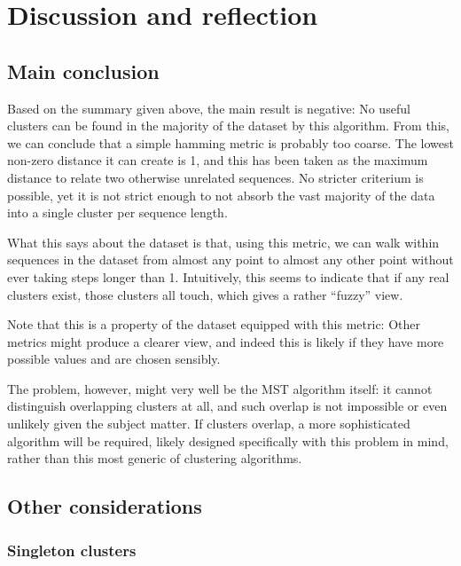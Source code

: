 \documentclass[fleqn]{book}
\begin{document}
\chapter{Discussion and reflection}\label{discussion-and-reflection}

\section{Main conclusion}\label{main-conclusion}

Based on the summary given above, the main result is negative: No useful
clusters can be found in the majority of the dataset by this algorithm.
From this, we can conclude that a simple hamming metric is probably too
coarse. The lowest non-zero distance it can create is 1, and this has
been taken as the maximum distance to relate two otherwise unrelated
sequences. No stricter criterium is possible, yet it is not strict
enough to not absorb the vast majority of the data into a single cluster
per sequence length.

What this says about the dataset is that, using this metric, we can walk
within sequences in the dataset from almost any point to almost any
other point without ever taking steps longer than 1. Intuitively, this
seems to indicate that if any real clusters exist, those clusters all
touch, which gives a rather ``fuzzy'' view.

Note that this is a property of the dataset equipped with this metric:
Other metrics might produce a clearer view, and indeed this is likely if
they have more possible values and are chosen sensibly.

The problem, however, might very well be the MST algorithm itself: it
cannot distinguish overlapping clusters at all, and such overlap is not
impossible or even unlikely given the subject matter. If clusters
overlap, a more sophisticated algorithm will be required, likely
designed specifically with this problem in mind, rather than this most
generic of clustering algorithms.

\section{Other considerations}\label{other-considerations}

\subsection{Singleton clusters}\label{singleton-clusters}
\end{document}
